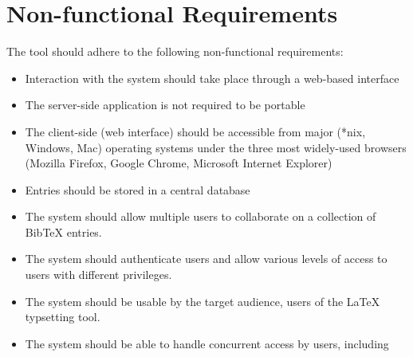 \documentclass{l3proj}
\begin{document}
\section*{Non-functional Requirements}
The tool should adhere to the following non-functional requirements:
\begin{itemize}
\item Interaction with the system should take place through a web-based interface
\item The server-side application is not required to be portable
\item The client-side (web interface) should be accessible from major (*nix, Windows, Mac) operating systems under the three most widely-used browsers (Mozilla Firefox, Google Chrome, Microsoft Internet Explorer)
\item Entries should be stored in a central database
\item The system should allow multiple users to collaborate on a collection of BibTeX entries.
\item The system should authenticate users and allow various levels of access to users with different privileges.
\item The system should be usable by the target audience, users of the LaTeX typsetting tool.
\item The system should be able to handle concurrent access by users, including 
\end{itemize}

































\end{document}
